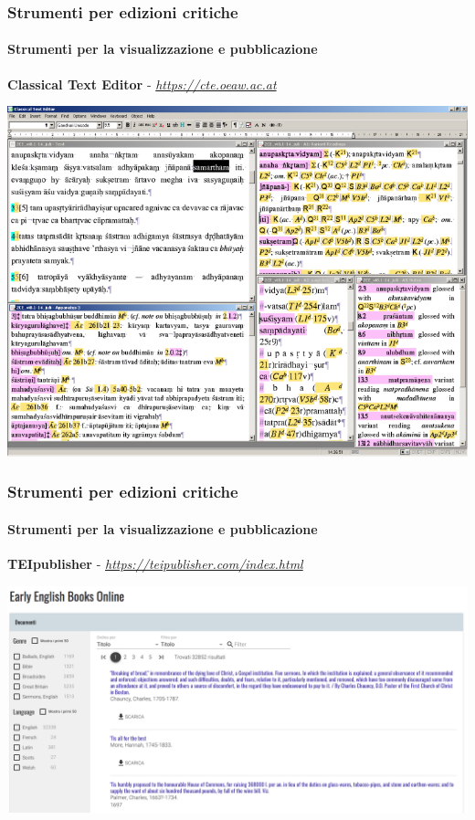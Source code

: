 \begin{frame}
    \frametitle{Strumenti per edizioni critiche}
    \framesubtitle{Strumenti per la visualizzazione e pubblicazione}
	\addtocounter{nframe}{1}
    \begin{center}
        \textbf{Classical Text Editor} - \textit{\url{https://cte.oeaw.ac.at}}
    \end{center}
    \begin{center}
        \includegraphics[width=.85\textwidth]{imgs/cte.png}
	\end{center}
\end{frame}

\begin{frame}
    \frametitle{Strumenti per edizioni critiche}
    \framesubtitle{Strumenti per la visualizzazione e pubblicazione}
	\addtocounter{nframe}{1}
    \begin{center}
        \textbf{TEIpublisher} - \textit{\url{https://teipublisher.com/index.html}}
    \end{center}
    \begin{center}
        \includegraphics[width=.95\textwidth]{imgs/teipublisher.png}
	\end{center}
\end{frame}

